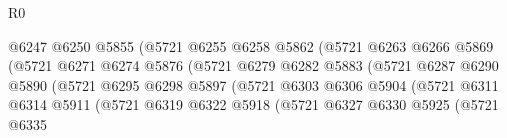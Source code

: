 \begin{lexlean}{R0}
\begin{coremodule}
                                          @6247
                                          @6250
                                          @5855
                                          (@5721
                                            @6255
                                            @6258
                                            @5862
                                            (@5721
                                              @6263
                                              @6266
                                              @5869
                                              (@5721
                                                @6271
                                                @6274
                                                @5876
                                                (@5721
                                                  @6279
                                                  @6282
                                                  @5883
                                                  (@5721
                                                    @6287
                                                    @6290
                                                    @5890
                                                    (@5721
                                                      @6295
                                                      @6298
                                                      @5897
                                                      (@5721
                                                        @6303
                                                        @6306
                                                        @5904
                                                        (@5721
                                                          @6311
                                                          @6314
                                                          @5911
                                                          (@5721
                                                            @6319
                                                            @6322
                                                            @5918
                                                            (@5721
                                                              @6327
                                                              @6330
                                                              @5925
                                                              (@5721
                                                                @6335

\end{coremodule}
\end{lexlean}
